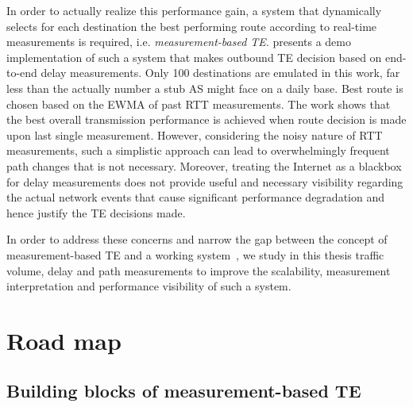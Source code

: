 In order to actually realize this performance gain, a system that dynamically selects for each destination the best performing route according to real-time measurements is required, i.e. \textit{measurement-based TE}.
\citet{Akella2008} presents a demo implementation of such a system that makes outbound TE decision based on end-to-end delay measurements. Only 100 destinations are emulated in this work, far less than the actually number a stub AS might face on a daily base. Best route is chosen based on the \ac{EWMA} of past \ac{RTT} measurements. The work shows that the best overall transmission performance is achieved when route decision is made upon last single measurement. However, considering the noisy nature of \ac{RTT} measurements, such a simplistic approach can lead to overwhelmingly frequent path changes that is not necessary. Moreover, treating the Internet as a blackbox for delay measurements does not provide useful and necessary visibility regarding the actual network events that cause significant performance degradation and hence justify the TE decisions made. 

In order to address these concerns and narrow the gap between the concept of measurement-based TE and a working system~\cite{b6}, we 
study in this thesis traffic volume, delay and path measurements to improve the scalability, measurement interpretation and performance visibility of such a system.


\section{Road map}
\subsection{Building blocks of measurement-based TE}

